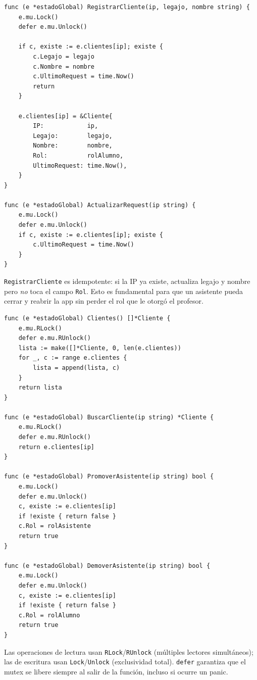 \documentclass[12pt, a4paper]{article}
\begin{document}
\begin{lstlisting}[style=golang, caption={Registro de clientes}]
func (e *estadoGlobal) RegistrarCliente(ip, legajo, nombre string) {
    e.mu.Lock()
    defer e.mu.Unlock()

    if c, existe := e.clientes[ip]; existe {
        c.Legajo = legajo
        c.Nombre = nombre
        c.UltimoRequest = time.Now()
        return
    }

    e.clientes[ip] = &Cliente{
        IP:            ip,
        Legajo:        legajo,
        Nombre:        nombre,
        Rol:           rolAlumno,
        UltimoRequest: time.Now(),
    }
}

func (e *estadoGlobal) ActualizarRequest(ip string) {
    e.mu.Lock()
    defer e.mu.Unlock()
    if c, existe := e.clientes[ip]; existe {
        c.UltimoRequest = time.Now()
    }
}
\end{lstlisting}

\texttt{RegistrarCliente} es idempotente: si la IP ya existe, actualiza legajo y nombre
pero \emph{no} toca el campo \texttt{Rol}. Esto es fundamental para que un asistente
pueda cerrar y reabrir la app sin perder el rol que le otorgó el profesor.

\begin{lstlisting}[style=golang, caption={Consulta y modificacion de clientes}]
func (e *estadoGlobal) Clientes() []*Cliente {
    e.mu.RLock()
    defer e.mu.RUnlock()
    lista := make([]*Cliente, 0, len(e.clientes))
    for _, c := range e.clientes {
        lista = append(lista, c)
    }
    return lista
}

func (e *estadoGlobal) BuscarCliente(ip string) *Cliente {
    e.mu.RLock()
    defer e.mu.RUnlock()
    return e.clientes[ip]
}

func (e *estadoGlobal) PromoverAsistente(ip string) bool {
    e.mu.Lock()
    defer e.mu.Unlock()
    c, existe := e.clientes[ip]
    if !existe { return false }
    c.Rol = rolAsistente
    return true
}

func (e *estadoGlobal) DemoverAsistente(ip string) bool {
    e.mu.Lock()
    defer e.mu.Unlock()
    c, existe := e.clientes[ip]
    if !existe { return false }
    c.Rol = rolAlumno
    return true
}
\end{lstlisting}

Las operaciones de lectura usan \texttt{RLock}/\texttt{RUnlock} (múltiples lectores
simultáneos); las de escritura usan \texttt{Lock}/\texttt{Unlock} (exclusividad total).
\texttt{defer} garantiza que el mutex se libere siempre al salir de la función, incluso
si ocurre un panic.
\end{document}
